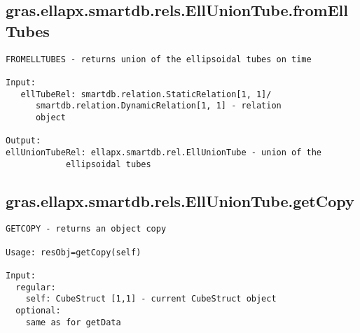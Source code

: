 \subsection{\texorpdfstring{gras.ellapx.smartdb.rels.EllUnionTube.fromEllTubes}{fromEllTubes}}\label{method:gras.ellapx.smartdb.rels.EllUnionTube.fromEllTubes}
\begin{verbatim}
FROMELLTUBES - returns union of the ellipsoidal tubes on time

Input:
   ellTubeRel: smartdb.relation.StaticRelation[1, 1]/
      smartdb.relation.DynamicRelation[1, 1] - relation
      object

Output:
ellUnionTubeRel: ellapx.smartdb.rel.EllUnionTube - union of the
            ellipsoidal tubes
\end{verbatim}
\subsection{\texorpdfstring{gras.ellapx.smartdb.rels.EllUnionTube.getCopy}{getCopy}}\label{method:gras.ellapx.smartdb.rels.EllUnionTube.getCopy}
\begin{verbatim}
GETCOPY - returns an object copy

Usage: resObj=getCopy(self)

Input:
  regular:
    self: CubeStruct [1,1] - current CubeStruct object
  optional:
    same as for getData
\end{verbatim}
